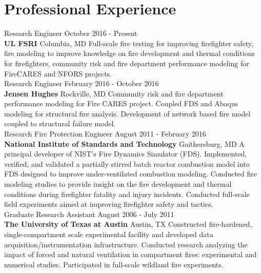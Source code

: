 \documentclass[10pt,letterpaper]{article}
\begin{document}
\section*{Professional Experience}
Research Engineer \hfill October 2016 - Present \\
{\bf UL FSRI} \hfill Columbia, MD \vskip3pt
Full-scale fire testing for improving firefighter safety, fire modeling to improve knowledge on fire development and thermal conditions for firefighters, community risk and fire department performance modeling for FireCARES and NFORS projects. \\

Research Engineer \hfill February 2016 - October 2016 \\
{\bf Jensen Hughes} \hfill Rockville, MD \vskip3pt
Community risk and fire department performance modeling for Fire CARES project. Coupled FDS and Abaqus modeling for structural fire analysis. Development of network based fire model coupled to structural failure model.\\

Research Fire Protection Engineer \hfill August 2011 - February 2016 \\
{\bf National Institute of Standards and Technology} \hfill Gaithersburg, MD \vskip3pt
A principal developer of NIST's Fire Dynamics Simulator (FDS). Implemented, verified, and validated a partially stirred batch reactor combustion model into FDS designed to improve under-ventilated combustion modeling. Conducted fire modeling studies to provide insight on the fire development and thermal conditions during firefighter fatality and injury incidents. Conducted full-scale field experiments aimed at improving firefighter safety and tactics. \\

Graduate Research Assistant \hfill August 2006 - July 2011 \\
{\bf The University of Texas at Austin} \hfill Austin, TX \vskip3pt
Constructed fire-hardened, single-compartment scale experimental facility and developed data acquisition/instrumentation infrastructure. Conducted research analyzing the impact of forced and natural ventilation in compartment fires: experimental and numerical studies. Participated in full-scale wildland fire experiments. \\

\end{document}

